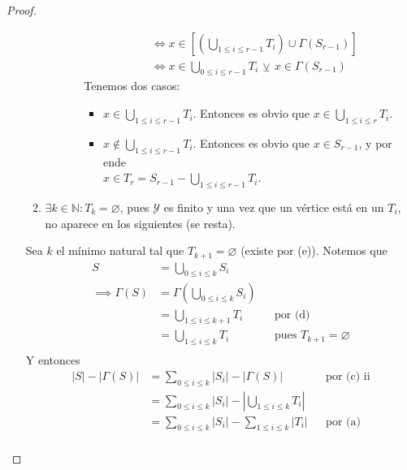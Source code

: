 \begin{proof}
\begin{enumerate}
\begin{enumerate}
\begin{itemize}
\begin{itemize}
\begin{align}
                &\iff 
                x \in \left[\left( \bigcup \limits_{1 \le i \le r-1} T_i \right) \cup \Gamma(S_{r-1}) \right] \\
                &\iff x \in \bigcup \limits_{0 \le i \le r-1} T_i \, \veebar\, x \in \Gamma(S_{r-1})
            \end{align}
            Tenemos dos casos:
            \begin{itemize}
                \item $x \in \bigcup \limits_{1 \le i \le r-1} T_i$. Entonces es obvio que $x \in \bigcup \limits_{1 \le i \le r} T_i$.
                \item $x \notin \bigcup \limits_{1 \le i \le r-1} T_i$. Entonces es obvio que $x \in S_{r-1}$, y por ende \\$x \in T_r = S_{r-1} - \bigcup \limits_{1 \le i \le r-1} T_i $.
            \end{itemize}
            \end{itemize}
        \end{itemize}
        \item $\exists k \in \mathbb{N} : T_k = \varnothing$, pues $\mathcal{Y}$ es finito y una vez que un vértice está en un $T_i$, no aparece en los siguientes (se resta). 
    \end{enumerate}
    Sea $k$ el mínimo natural tal que $T_{k+1} = \varnothing$ (existe por (e)). Notemos que
    \begin{align}
        S &= \bigcup \limits_{0 \le i \le k} S_i\\
        \implies \Gamma(S) &= \Gamma \left( \bigcup \limits_{0 \le i \le k} S_i \right)\\
        &= \bigcup \limits_{1 \le i \le k+1} T_i && \text{por (d)}\\
        &= \bigcup \limits_{1 \le i \le k} T_i && \text{pues $T_{k+1} = \varnothing$}\\
    \end{align}
    Y entonces
    \begin{align}
        \left| S \right| - \left| \Gamma(S) \right|
        &= \sum \limits_{0 \le i \le k} \left| S_i \right| - \left| \Gamma(S) \right| && \text{por (c) ii}\\
        &= \sum \limits_{0 \le i \le k} \left| S_i \right| - \left| \bigcup \limits_{1 \le i \le k} T_i  \right|\\
        &= \sum \limits_{0 \le i \le k} \left| S_i \right| - \sum \limits_{1 \le i \le k} \left| T_i \right| && \text{por (a)}\\

\end{align}
\end{enumerate}
\end{proof}
